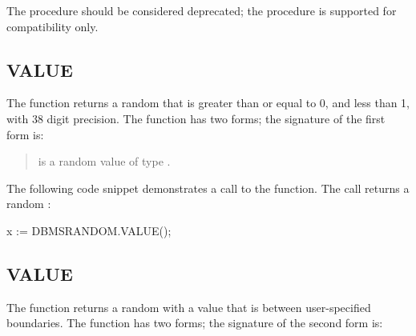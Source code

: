 \documentclass[letterpaper,10pt,english,openany,oneside]{sphinxmanual}
\begin{document}
The  procedure should be considered deprecated; the procedure
is supported for compatibility only.

\ignorespaces 

\subsection{VALUE}
\label{\detokenize{dbms_random:index-8}}\label{\detokenize{dbms_random:value}}
The  function returns a random  that is greater than or equal
to 0, and less than 1, with 38 digit precision. The  function has
two forms; the signature of the first form is:
\begin{quote}

\end{quote}


\begin{quote}

 is a random value of type .
\end{quote}


The following code snippet demonstrates a call to the  function.
The call returns a random :

%
\begin{sphinxVerbatim}[commandchars=\\\{\}]
x := DBMS\PYGZus{}RANDOM.VALUE();
\end{sphinxVerbatim}

\ignorespaces 

\subsection{VALUE}
\label{\detokenize{dbms_random:id2}}\label{\detokenize{dbms_random:index-9}}
The  function returns a random  with a value that is between
user-specified boundaries. The  function has two forms; the
signature of the second form is:
\begin{quote}

\end{quote}
\end{document}
